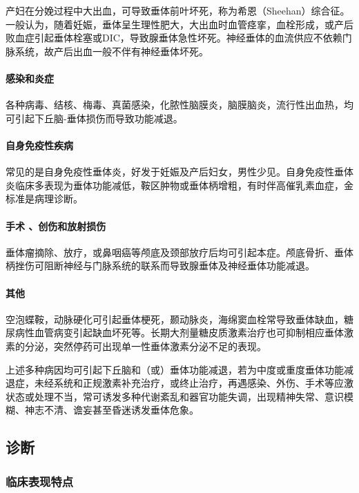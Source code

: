 产妇在分娩过程中大出血，可导致垂体前叶坏死，称为希恩（Sheehan）综合征。一般认为，随着妊娠，垂体呈生理性肥大，大出血时血管痉挛，血栓形成，或产后败血症引起垂体栓塞或DIC，导致腺垂体急性坏死。神经垂体的血流供应不依赖门脉系统，故产后出血一般不伴有神经垂体坏死。

\paragraph{感染和炎症}

各种病毒、结核、梅毒、真菌感染，化脓性脑膜炎，脑膜脑炎，流行性出血热，均可引起下丘脑-垂体损伤而导致功能减退。

\paragraph{自身免疫性疾病}

常见的是自身免疫性垂体炎，好发于妊娠及产后妇女，男性少见。自身免疫性垂体炎临床多表现为垂体功能减低，鞍区肿物或垂体柄增粗，有时伴高催乳素血症，金标准是病理诊断。

\paragraph{手术 、创伤和放射损伤}

垂体瘤摘除、放疗，或鼻咽癌等颅底及颈部放疗后均可引起本症。颅底骨折、垂体柄挫伤可阻断神经与门脉系统的联系而导致腺垂体及神经垂体功能减退。

\paragraph{其他}

空泡蝶鞍，动脉硬化可引起垂体梗死，颞动脉炎，海绵窦血栓常导致垂体缺血，糖尿病性血管病变引起缺血坏死等。长期大剂量糖皮质激素治疗也可抑制相应垂体激素的分泌，突然停药可出现单一性垂体激素分泌不足的表现。

上述多种病因均可引起下丘脑和（或）垂体功能减退，若为中度或重度垂体功能减退症，未经系统和正规激素补充治疗，或终止治疗，再遇感染、外伤、手术等应激状态或处理不当，常可诱发多种代谢紊乱和器官功能失调，出现精神失常、意识模糊、神志不清、谵妄甚至昏迷诱发垂体危象。

\subsection{诊断}

\subsubsection{临床表现特点}

